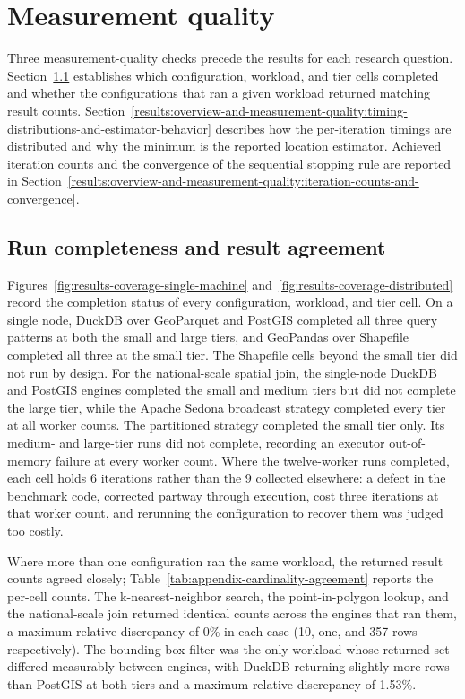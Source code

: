 \section{Measurement quality}
\label{results:overview-and-measurement-quality}

Three measurement-quality checks precede the results for each research question. Section~\ref{results:overview-and-measurement-quality:run-completeness-and-result-agreement} establishes which configuration, workload, and tier cells completed and whether the configurations that ran a given workload returned matching result counts. Section~\ref{results:overview-and-measurement-quality:timing-distributions-and-estimator-behavior} describes how the per-iteration timings are distributed and why the minimum is the reported location estimator. Achieved iteration counts and the convergence of the sequential stopping rule are reported in Section~\ref{results:overview-and-measurement-quality:iteration-counts-and-convergence}.

\subsection{Run completeness and result agreement}
\label{results:overview-and-measurement-quality:run-completeness-and-result-agreement}

Figures~\ref{fig:results-coverage-single-machine} and~\ref{fig:results-coverage-distributed} record the completion status of every configuration, workload, and tier cell. On a single node, DuckDB over GeoParquet and PostGIS completed all three query patterns at both the small and large tiers, and GeoPandas over Shapefile completed all three at the small tier. The Shapefile cells beyond the small tier did not run by design. For the national-scale spatial join, the single-node DuckDB and PostGIS engines completed the small and medium tiers but did not complete the large tier, while the Apache Sedona broadcast strategy completed every tier at all worker counts. The partitioned strategy completed the small tier only. Its medium- and large-tier runs did not complete, recording an executor out-of-memory failure at every worker count. Where the twelve-worker runs completed, each cell holds \num{6} iterations rather than the \num{9} collected elsewhere: a defect in the benchmark code, corrected partway through execution, cost three iterations at that worker count, and rerunning the configuration to recover them was judged too costly.

Where more than one configuration ran the same workload, the returned result counts agreed closely; Table~\ref{tab:appendix-cardinality-agreement} reports the per-cell counts. The k-nearest-neighbor search, the point-in-polygon lookup, and the national-scale join returned identical counts across the engines that ran them, a maximum relative discrepancy of \num{0}\% in each case (\num{10}, one, and \num{357} rows respectively). The bounding-box filter was the only workload whose returned set differed measurably between engines, with DuckDB returning slightly more rows than PostGIS at both tiers and a maximum relative discrepancy of \num{1.53}\%.

